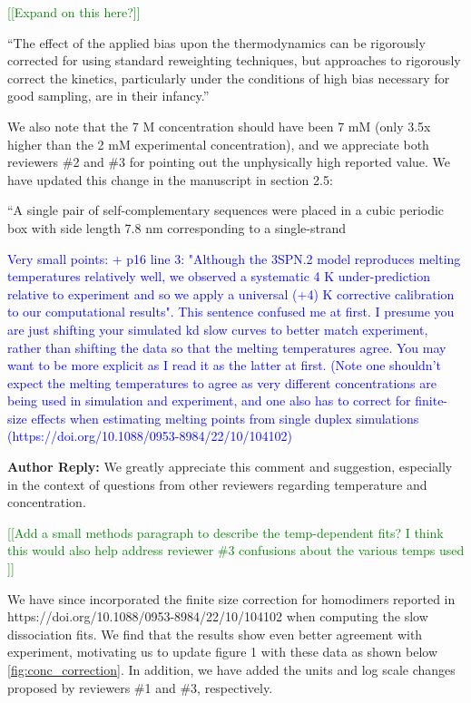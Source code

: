 \documentclass[11pt,a4paper]{letter} %
\newcommand*{\rood}[1]{{\color{red}{#1}}}
\newcommand*{\noteg}[1]{\textcolor{green}{[[#1]]}}		%
\begin{document}
\noteg{Expand on this here?}

``The effect of the applied bias upon the thermodynamics can be rigorously corrected for using standard reweighting techniques, but approaches to rigorously correct the kinetics, particularly under the conditions of high bias necessary for good sampling, are in their infancy.''

We also note that the 7 M concentration should have been 7 mM (only 3.5x higher than the 2 mM experimental concentration), and we appreciate both reviewers \#2 and \#3 for pointing out the unphysically high reported value. We have updated this change in the manuscript in section 2.5:

``A single pair of self-complementary sequences were placed in a cubic periodic box with side length 7.8 nm corresponding to a single-strand \rood{concentration of 7 mMol/L.''}

\textcolor{blue}{Very small points:
+ p16 line 3: "Although the 3SPN.2 model reproduces melting temperatures relatively well, we observed a systematic 4 K under-prediction relative to experiment and so we apply a universal (+4) K corrective calibration to our computational results". This sentence confused me at first. I presume you are just shifting your simulated kd slow curves to better match experiment, rather than shifting the data so that the melting temperatures agree. You may want to be more explicit as I read it as the latter at first. (Note one shouldn't expect the melting temperatures to agree as very different concentrations are being used in simulation and experiment, and one also has to correct for finite-size effects when estimating melting points from single duplex simulations (https://doi.org/10.1088/0953-8984/22/10/104102)}

\textbf{Author Reply:}   We greatly appreciate this comment and suggestion, especially in the context of questions from other reviewers regarding temperature and concentration. 

\noteg{Add a small methods paragraph to describe the temp-dependent fits? I think this would also help address reviewer \#3 confusions about the various temps used }

We have since incorporated the finite size correction for homodimers reported in  https://doi.org/10.1088/0953-8984/22/10/104102 \citep{Ouldridge2010ExtractingSimulations} when computing the slow dissociation fits. We find that the results show even better agreement with experiment, motivating us to update figure 1 with these data as shown below \ref{fig:conc_correction}. In addition, we have added the units and log scale changes proposed by reviewers \#1 and \#3, respectively.
\end{document}

